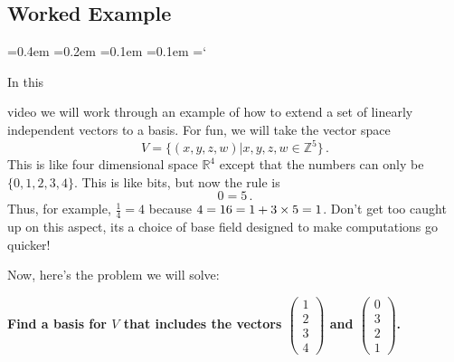 
\subsection*{Worked Example}

{\ttfamily
{}\font=0.4em
\font=0.2em
\font=0.1em
\font=0.1em
\hyphenchar\font=`\-


\hypertarget{basis_and_dimension_example}{In this} 
video we will work through an example of how to extend a set of linearly independent vectors to a basis. For fun, we will take
the vector space 
\[
V=\{(x,y,z,w)|x,y,z,w\in {\mathbb Z}^5\}\, .
\]
This is like four dimensional space ${\mathbb R}^4$ except that the numbers can only be $\{0,1,2,3,4\}$. This is like bits, but now the rule is
\[
0=5\, .
\]
Thus, for example,  $\frac14=4$ because $4\time 4=16=1+3\times 5=1$. Don't get too caught up on this aspect, its a choice of base field designed
to make computations go quicker!

Now, here's the problem we will solve:

\begin{center}
{\bfseries Find a basis for $V$ that includes the vectors $\begin{pmatrix}1\\2\\3\\4\end{pmatrix}$ and $\begin{pmatrix}0\\3\\2\\1\end{pmatrix}$.}
\end{center}

}
